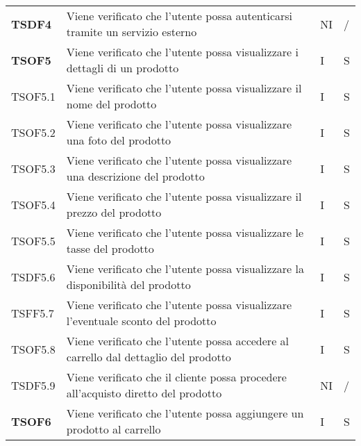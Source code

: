 \begin{center}
\begin{longtable}[!h]{p{60px} p{240px} p{35px} p{35px}}
        \textbf{TSDF4}  & Viene verificato che l'utente possa autenticarsi tramite un servizio esterno                                        & NI             & /              \\
        \textbf{TSOF5}  & Viene verificato che l'utente possa visualizzare i dettagli di un prodotto                                          & I              & S              \\
        TSOF5.1         & Viene verificato che l'utente possa visualizzare il nome del prodotto                                               & I              & S              \\
        TSOF5.2         & Viene verificato che l'utente possa visualizzare una foto del prodotto                                              & I              & S              \\
        TSOF5.3         & Viene verificato che l'utente possa visualizzare una descrizione del prodotto                                       & I              & S              \\
        TSOF5.4         & Viene verificato che l'utente possa visualizzare il prezzo del prodotto                                             & I              & S              \\
        TSOF5.5         & Viene verificato che l'utente possa visualizzare le tasse del prodotto                                              & I              & S              \\
        TSDF5.6         & Viene verificato che l'utente possa visualizzare la disponibilità del prodotto                                      & I              & S              \\
        TSFF5.7         & Viene verificato che l'utente possa visualizzare l'eventuale sconto del prodotto                                    & I              & S              \\
        TSOF5.8         & Viene verificato che l'utente possa accedere al carrello dal dettaglio del prodotto                                 & I              & S              \\
        TSDF5.9         & Viene verificato che il cliente possa procedere all'acquisto diretto del prodotto                                   & NI             & /              \\
        \textbf{TSOF6}  & Viene verificato che l'utente possa aggiungere un prodotto al carrello                                              & I              & S              \\

\end{longtable}
\end{center}

